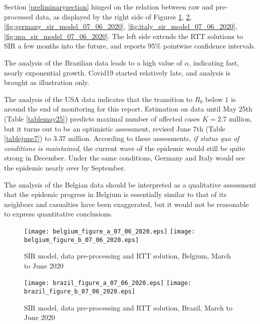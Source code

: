 \documentclass{article}
\begin{document}
Section \ref{preliminarysection} hinged on the relation between raw and pre-processed data, as displayed by the right side of Figures \ref{fig:belgium_sir_model_07_06_2020}, \ref{fig:brazil_sir_model_07_06_2020}, \ref{fig:germany_sir_model_07_06_2020}, \ref{fig:italy_sir_model_07_06_2020}, \ref{fig:usa_sir_model_07_06_2020}. The left side extends the RTT solutions to SIR a few months into the future, and reports $95\%$ pointwise confidence intervals.

The analysis of the Brazilian data leads to a high value of $\alpha$, indicating fast, nearly exponential growth. Covid19 started relatively late, and analysis is brought as illustration only.

The analysis of the USA data indicates that the transition to $R_0$ below $1$ is around the end of monitoring for this report. Estimation on data until May 25th (Table \ref{tablemay25}) predicts maximal number of affected cases $K=2.7$ million, but it turns out to be an optimistic assessment, revised June 7th (Table \ref{tablejune7}) to $3.37$ million. According to these assessments, {\em if status quo of conditions is maintained}, the current wave of the epidemic would still be quite strong in December. Under the same conditions, Germany and Italy would see the epidemic nearly over by September.

The analysis of the Belgian data should be interpreted as a qualitative assessment that the epidemic progress in Belgium is essentially similar to that of its neighbors and casualties have been exaggerated, but it would not be reasonable to express quantitative conclusions.

\begin{figure}
\begin{center}
{\texttt{[image: belgium\_figure\_a\_07\_06\_2020.eps]}}
\qquad
{\texttt{[image: belgium\_figure\_b\_07\_06\_2020.eps]}}
\end{center}
\begin{center}
\caption{SIR model, data pre-processing and RTT solution, Belgium, March to June 2020
}
\label{fig:belgium_sir_model_07_06_2020}
\end{center}
\end{figure}

\begin{figure}
\begin{center}
{\texttt{[image: brazil\_figure\_a\_07\_06\_2020.eps]}}
\qquad
{\texttt{[image: brazil\_figure\_b\_07\_06\_2020.eps]}}
\end{center}
\begin{center}
\caption{SIR model, data pre-processing and RTT solution, Brazil, March to June 2020
}
\label{fig:brazil_sir_model_07_06_2020}
\end{center}
\end{figure}
\end{document}
